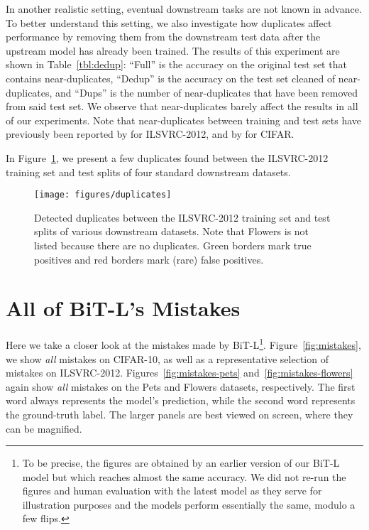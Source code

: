\documentclass[runningheads]{llncs}
\newcommand{\name}{{BiT}}
\newcommand{\imagenet}{{ILSVRC-2012}}
\begin{document}
In another realistic setting, eventual downstream tasks are not known in advance.
To better understand this setting, we also investigate how duplicates affect performance by removing them from the downstream test data after the upstream model has already been trained.
The results of this experiment are shown in Table~\ref{tbl:dedup}: ``Full'' is the accuracy on the original test set that contains near-duplicates, ``Dedup'' is the accuracy on the test set cleaned of near-duplicates, and ``Dups'' is the number of near-duplicates that have been removed from said test set.
We observe that near-duplicates barely affect the results in all of our experiments.
Note that near-duplicates between training and test sets have previously been reported by \cite{sun2017revisiting} for \imagenet{}, and by \cite{barz2019duplicates} for CIFAR.

In Figure~\ref{fig:duplicates}, we present a few duplicates found between the ILSVRC-2012 training set and test splits of four standard downstream datasets.

\begin{figure}[t]
\begin{center}
   \texttt{[image: figures/duplicates]}
\end{center}
\caption{Detected duplicates between the \imagenet{} training set and test splits of various downstream datasets. Note that Flowers is not listed because there are no duplicates. Green borders mark true positives and red borders mark (rare) false positives.}
\label{fig:duplicates}
\end{figure}

\clearpage

\section{All of \name{}-L's Mistakes}\label{sec:all-mistakes}

Here we take a closer look at the mistakes made by \name{}-L\footnote{To be precise, the figures are obtained by an earlier version of our \name{}-L model but which reaches almost the same accuracy. We did not re-run the figures and human evaluation with the latest model as they serve for illustration purposes and the models perform essentially the same, modulo a few flips.}.
Figure~\ref{fig:mistakes}, we show \emph{all} mistakes on CIFAR-10, as well as a representative selection of mistakes on ILSVRC-2012.
Figures~\ref{fig:mistakes-pets} and~\ref{fig:mistakes-flowers} again show \emph{all} mistakes on the Pets and Flowers datasets, respectively.
The first word always represents the model's prediction, while the second word represents the ground-truth label.
The larger panels are best viewed on screen, where they can be magnified.
\end{document}
